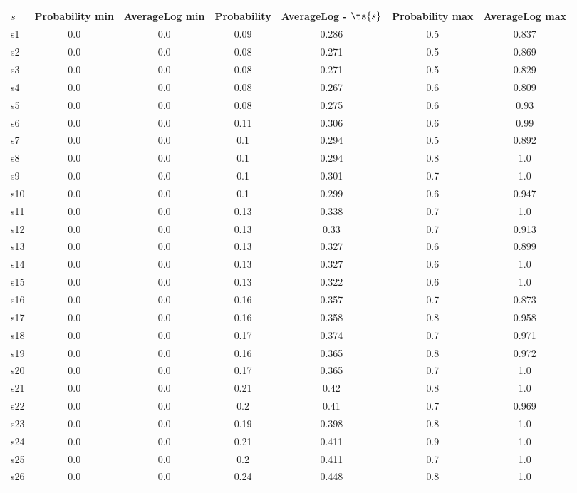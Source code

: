 \documentclass{article}
\begin{document}
\noindent\begin{tabular}{|l|c|c|c|c|c|c|}
\hline
$s$& Probability min & AverageLog min & Probability & AverageLog - $\ts{s}$ & Probability max & AverageLog max\\
\hline
s1 &0.0 & 0.0 & 0.09 & 0.286 & 0.5 & 0.837\\
\hline
s2 &0.0 & 0.0 & 0.08 & 0.271 & 0.5 & 0.869\\
\hline
s3 &0.0 & 0.0 & 0.08 & 0.271 & 0.5 & 0.829\\
\hline
s4 &0.0 & 0.0 & 0.08 & 0.267 & 0.6 & 0.809\\
\hline
s5 &0.0 & 0.0 & 0.08 & 0.275 & 0.6 & 0.93\\
\hline
s6 &0.0 & 0.0 & 0.11 & 0.306 & 0.6 & 0.99\\
\hline
s7 &0.0 & 0.0 & 0.1 & 0.294 & 0.5 & 0.892\\
\hline
s8 &0.0 & 0.0 & 0.1 & 0.294 & 0.8 & 1.0\\
\hline
s9 &0.0 & 0.0 & 0.1 & 0.301 & 0.7 & 1.0\\
\hline
s10 &0.0 & 0.0 & 0.1 & 0.299 & 0.6 & 0.947\\
\hline
s11 &0.0 & 0.0 & 0.13 & 0.338 & 0.7 & 1.0\\
\hline
s12 &0.0 & 0.0 & 0.13 & 0.33 & 0.7 & 0.913\\
\hline
s13 &0.0 & 0.0 & 0.13 & 0.327 & 0.6 & 0.899\\
\hline
s14 &0.0 & 0.0 & 0.13 & 0.327 & 0.6 & 1.0\\
\hline
s15 &0.0 & 0.0 & 0.13 & 0.322 & 0.6 & 1.0\\
\hline
s16 &0.0 & 0.0 & 0.16 & 0.357 & 0.7 & 0.873\\
\hline
s17 &0.0 & 0.0 & 0.16 & 0.358 & 0.8 & 0.958\\
\hline
s18 &0.0 & 0.0 & 0.17 & 0.374 & 0.7 & 0.971\\
\hline
s19 &0.0 & 0.0 & 0.16 & 0.365 & 0.8 & 0.972\\
\hline
s20 &0.0 & 0.0 & 0.17 & 0.365 & 0.7 & 1.0\\
\hline
s21 &0.0 & 0.0 & 0.21 & 0.42 & 0.8 & 1.0\\
\hline
s22 &0.0 & 0.0 & 0.2 & 0.41 & 0.7 & 0.969\\
\hline
s23 &0.0 & 0.0 & 0.19 & 0.398 & 0.8 & 1.0\\
\hline
s24 &0.0 & 0.0 & 0.21 & 0.411 & 0.9 & 1.0\\
\hline
s25 &0.0 & 0.0 & 0.2 & 0.411 & 0.7 & 1.0\\
\hline
s26 &0.0 & 0.0 & 0.24 & 0.448 & 0.8 & 1.0\\

\end{tabular}
\end{document}
